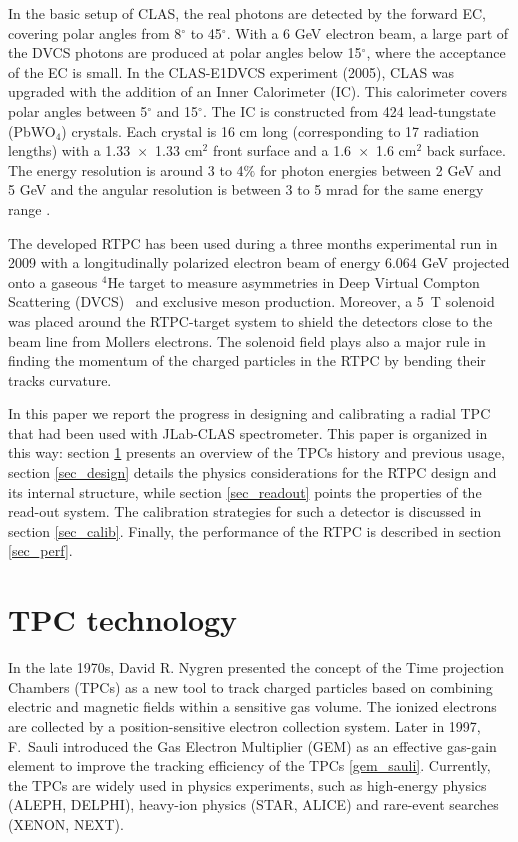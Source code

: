 \documentclass[twocolumn,showpacs,superscriptaddress,groupedaddress]{revtex4}
\begin{document}
In the basic setup of CLAS, the real photons are detected by the forward EC, 
covering polar angles from 8$^{\circ}$ to 45$^{\circ}$. With a 6 GeV electron 
beam, a large part of the DVCS photons are produced at polar angles below 
15$^{\circ}$, where the acceptance of the EC is small. In the CLAS-E1DVCS 
experiment (2005), CLAS was upgraded with the addition of an Inner Calorimeter 
(IC). This calorimeter covers polar angles between 5$^{\circ}$ and 
15$^{\circ}$. The IC is constructed from 424 lead-tungstate (PbWO$_{4}$) 
crystals. Each crystal is 16 cm long (corresponding to 17 radiation lengths) 
with a 1.33~$\times$~1.33 cm$^2$ front surface and a 1.6~$\times$~1.6 cm$^2$ 
back surface. The energy resolution is around 3 to 4$\%$ for photon energies 
between 2 GeV and 5 GeV and the angular resolution is between 3 to 5 mrad for 
the same energy range \cite{Hyon-suk}.

The developed RTPC has been used during a three months experimental run in 2009 
with a longitudinally polarized electron beam of energy 6.064 GeV projected 
onto a gaseous $^{4}$He target to measure asymmetries in Deep Virtual Compton 
Scattering (DVCS)~\cite{proposal} and exclusive meson production. Moreover, a 
5~T solenoid was placed around the RTPC-target system to shield the detectors 
close to the beam line from Mollers electrons. The solenoid field plays also a 
major rule in finding the momentum of the charged particles in the RTPC by 
bending their tracks curvature.

In this paper we report the progress in designing and calibrating a radial TPC 
that had been used with JLab-CLAS spectrometer. This paper is organized in this 
way: section \ref{prev_tpc} presents an overview of the TPCs history and 
previous usage, section \ref{sec_design} details the physics considerations for 
the RTPC design and its internal structure, while section \ref{sec_readout} 
points the properties of the read-out system.  The calibration strategies for 
such a detector is discussed in section \ref{sec_calib}. Finally, the 
performance of the RTPC is described
in section \ref{sec_perf}.

\section{TPC technology} \label{prev_tpc}
In the late 1970s, David R. Nygren presented the concept of the Time projection 
Chambers (TPCs) as a new tool to track charged particles based on combining 
electric and magnetic fields within a sensitive gas volume. The ionized 
electrons are collected by a position-sensitive electron collection system.  
Later in 1997, F.~Sauli introduced the Gas Electron Multiplier (GEM) as an 
effective gas-gain element to improve the tracking efficiency of the TPCs 
\ref{gem_sauli}. Currently, the TPCs are widely used in physics experiments, 
such as high-energy physics (ALEPH, DELPHI), heavy-ion physics (STAR, ALICE) 
and rare-event searches (XENON, NEXT).
\end{document}
